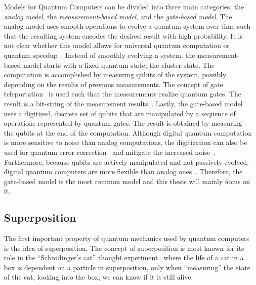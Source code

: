 Models for Quantum Computers can be divided into three main categories, the \emph{analog model}, the \emph{measurement-based model}, and the \emph{gate-based model}. The analog model uses smooth operations to evolve a quantum system over time such that the resulting system encodes the desired result with high probability. It is not clear whether this model allows for universal quantum computation or quantum speedup~\cite{DiCh20}. Instead of smoothly evolving a system, the measurement-based model starts with a fixed quantum state, the cluster-state. The computation is accomplished by measuring qubits of the system, possibly depending on the results of previous measurements. The concept of gate teleportation~ is used such that the measurements realize quantum gates. The result is a bit-string of the measurement results~\cite{DiCh20, Niel06}. Lastly, the gate-based model uses a digitized, discrete set of qubits that are manipulated by a sequence of operations represented by quantum gates. The result is obtained by measuring the qubits at the end of the computation. Although digital quantum computation is more sensitive to noise than analog computations, the digitization can also be used for quantum error correction~\cite{DMN13} and mitigate the increased noise~\cite{DiCh20}. Furthermore, because qubits are actively manipulated and not passively evolved, digital quantum computers are more flexible than analog ones~\cite{RDB*22}. Therefore, the gate-based model is the most common model and this thesis will mainly focus on it. 

\subsection{Superposition} 
The first important property of quantum mechanics used by quantum computers is the idea of superposition. The concept of superposition is most known for its role in the ``Schrödinger's cat'' thought experiment~\cite{Wine13} where the life of a cat in a box is dependent on a particle in superposition, only when ``measuring'' the state of the cat, \ie looking into the box, we can know if it is still alive. 

